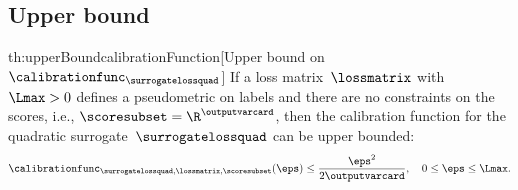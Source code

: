 \documentclass{article}
\begin{document}
\subsection{Upper bound}
\label{sec:boundscalibrationFunction:upper}
\begin{reptheorem}{th:upperBoundcalibrationFunction}[Upper bound on $\calibrationfunc_{\surrogatelossquad}$]
    \label{th:rep:upperBoundcalibrationFunction}
    If a loss matrix~$\lossmatrix$ with $\Lmax > 0$ defines a pseudometric on labels and there are no constraints on the scores, i.e., $\scoresubset = \R^{\outputvarcard}$, then the calibration function for the quadratic surrogate~$\surrogatelossquad$ can be upper bounded:
    \begin{equation*}
    \calibrationfunc_{\surrogatelossquad,\lossmatrix,\scoresubset}(\eps)
    \leq  \frac{\eps^2}{2\outputvarcard}, \quad 0 \leq \eps \leq \Lmax.
    \end{equation*}
\end{reptheorem}
\end{document}
